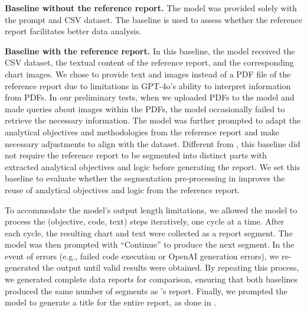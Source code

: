 \textbf{Baseline without the reference report.} The model was provided solely with the prompt and CSV dataset. 
The baseline is used to assess whether the reference report facilitates better data analysis.

\textbf{Baseline with the reference report. } In this baseline, the model received the CSV dataset, the textual content of the reference report, and the corresponding chart images. 
We chose to provide text and images instead of a PDF file of the reference report due to limitations in GPT-4o's ability to interpret information from PDFs. 
In our preliminary tests, when we uploaded PDFs to the model and made queries about images within the PDFs, the model occasionally failed to retrieve the necessary information. 
The model was further prompted to adapt the analytical objectives and methodologies from the reference report and make necessary adjustments to align with the dataset. 
Different from \system{}, this baseline did not require the reference report to be segmented into distinct parts with extracted analytical objectives and logic before generating the report. 
We set this baseline to evaluate whether the segmentation pre-processing in \system{} improves the reuse of analytical objectives and logic from the reference report. 

To accommodate the model's output length limitations, we allowed the model to process the (objective, code, text) steps iteratively, one cycle at a time. 
After each cycle, the resulting chart and text were collected as a report segment. 
The model was then prompted with ``Continue'' to produce the next segment. 
In the event of errors (e.g., failed code execution or OpenAI generation errors), we re-generated the output until valid results were obtained. 
By repeating this process, we generated complete data reports for comparison, ensuring that both baselines produced the same number of segments as \system{}'s report. 
Finally, we prompted the model to generate a title for the entire report, as done in \system{}.


